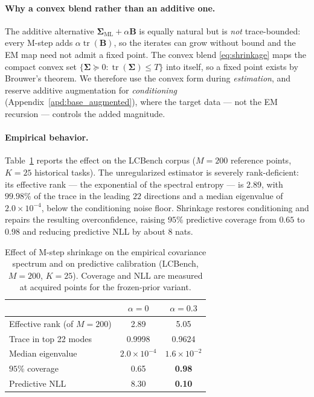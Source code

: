 \documentclass[10pt]{article}
\providecommand{\Cref}[1]{Appendix~\ref{#1}}
\newcommand{\bSigma}{\boldsymbol{\Sigma}}
\begin{document}
\paragraph{Why a convex blend rather than an additive one.}
The additive alternative $\bSigma_{\text{ML}} + \alpha\mathbf{B}$ is equally natural
but is \emph{not} trace-bounded: every M-step adds $\alpha\operatorname{tr}(\mathbf{B})$,
so the iterates can grow without bound and the EM map need not admit a fixed point.
The convex blend \eqref{eq:shrinkage} maps the compact convex set
$\{\bSigma\succeq 0 : \operatorname{tr}(\bSigma)\le T\}$ into itself, so a fixed
point exists by Brouwer's theorem. We therefore use the convex form during
\emph{estimation}, and reserve additive augmentation for \emph{conditioning}
(\Cref{apd:base_augmented}), where the target data --- not the EM recursion ---
controls the added magnitude.

\paragraph{Empirical behavior.}
Table~\ref{tab:shrinkage_spectrum} reports the effect on the LCBench corpus ($M=200$
reference points, $K=25$ historical tasks). The unregularized estimator is severely
rank-deficient: its effective rank --- the exponential of the spectral entropy ---
is $2.89$, with $99.98\%$ of the trace in the leading $22$ directions and a median
eigenvalue of $2.0\times10^{-4}$, below the conditioning noise floor. Shrinkage
restores conditioning and repairs the resulting overconfidence, raising $95\%$
predictive coverage from $0.65$ to $0.98$ and reducing predictive NLL by about
$8$ nats.

\begin{table}[ht]
\small\centering
\caption{Effect of M-step shrinkage on the empirical covariance spectrum and on
predictive calibration (LCBench, $M=200$, $K=25$). Coverage and NLL are measured at
acquired points for the frozen-prior variant.}
\label{tab:shrinkage_spectrum}
\begin{tabular}{lcc}
\toprule
 & $\alpha = 0$ & $\alpha = 0.3$ \\
\midrule
Effective rank (of $M=200$) & 2.89 & 5.05 \\
Trace in top 22 modes       & 0.9998 & 0.9624 \\
Median eigenvalue           & $2.0\times10^{-4}$ & $1.6\times10^{-2}$ \\
\midrule
$95\%$ coverage             & 0.65 & \textbf{0.98} \\
Predictive NLL              & 8.30 & \textbf{0.10} \\
\bottomrule
\end{tabular}
\end{table}
\end{document}
